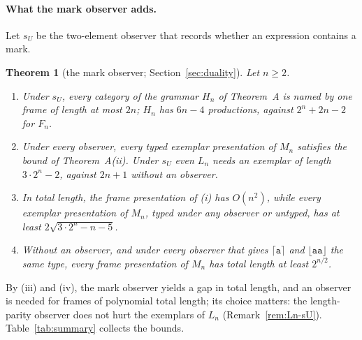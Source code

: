 \documentclass[11pt]{article}
\numberwithin{equation}{section}
\theoremstyle{plain}
\theoremstyle{definition}
\theoremstyle{remark}
\theoremstyle{plain}
\newtheorem{mainthm}{Theorem}
\newcommand{\Lfl}{\lfloor}
\newcommand{\Rfl}{\rfloor}
\newcommand{\Lce}{\lceil}
\newcommand{\Rce}{\rceil}
\newcommand{\ta}{\mathtt a}
\begin{document}
\paragraph{What the mark observer adds.}
Let $s_U$ be the two-element observer that records whether an expression
contains a mark.

\begin{mainthm}[the mark observer; Section~\ref{sec:duality}]
Let $n\ge2$.
\begin{enumerate}[label=\textup{(\roman*)},nosep]
\item Under $s_U$, every category of the grammar $H_n$ of Theorem~A is
named by one frame of length at most $2n$; $H_n$ has $6n-4$ productions,
against $2^n+2n-2$ for $F_n$.
\item Under every observer, every typed exemplar presentation of $M_n$
satisfies the bound of Theorem~A(ii).  Under $s_U$ even $L_n$ needs an
exemplar of length $3\cdot2^n-2$, against $2n+1$ without an observer.
\item In total length, the frame presentation of (i) has $O(n^2)$, while
every exemplar presentation of $M_n$, typed under any observer or untyped,
has at least $2\sqrt{3\cdot2^n-n-5}$.
\item Without an observer, and under every observer that gives
$\Lce\ta\Rce$ and $\Lfl\ta\ta\Rfl$ the same type, every frame presentation
of $M_n$ has total length at least $2^{n/2}$.
\end{enumerate}
\end{mainthm}

By (iii) and (iv), the mark observer yields a gap in total length, and an
observer is needed for frames of polynomial total length; its choice matters: the length-parity observer does not hurt the
exemplars of $L_n$ (Remark~\ref{rem:Ln-sU}).  Table~\ref{tab:summary}
collects the bounds.
\end{document}
